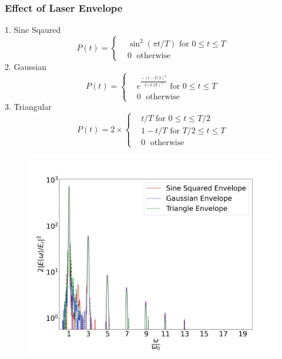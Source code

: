 \documentclass{beamer}
\begin{document}
\begin{frame}
    \frametitle{Effect of Laser Envelope}
    \tiny
    \begin{minipage}[t]{0.35\linewidth}
        1. Sine Sqaured
        \begin{equation*}\label{sin-sq-env}
            P(t)=
            \begin{cases}
                 & \sin^2(\pi t/T) \text{ for } 0 \leq t \le T \\
                 & 0         \;      \text{ otherwise }
            \end{cases}
        \end{equation*}
        2. Gaussian
        \begin{equation*}\label{gaussian-env}
            P(t)=
            \begin{cases}
                 & e^{\frac{-(t-T/2)^2}{2(0.2T)^2}} \text{ for } 0 \leq t \le T \\
                 & 0         \;      \text{ otherwise }
            \end{cases}
        \end{equation*}
        3. Triangular
        \begin{equation*}\label{triangle-env}
            P(t)= 2\times
            \begin{cases}
                 & t/T \text{ for } 0 \leq t \le T/2    \\
                 & 1-t/T \text{ for } T/2 \leq t \le T  \\
                 & 0         \;      \text{ otherwise }
            \end{cases}
        \end{equation*}
    \end{minipage}
    \begin{minipage}[t]{0.64\linewidth}
        \begin{figure}
            \centering
            \includegraphics[width=1.0\textwidth, height=0.8\textheight]{images/env2.jpg}
            \label{fig:LaserEnv}
        \end{figure}
    \end{minipage}


\end{frame}
\end{document}
